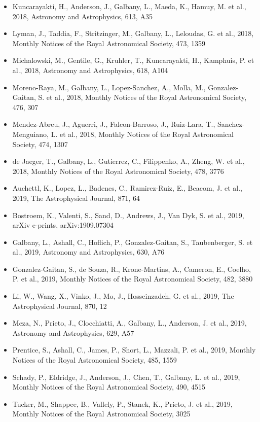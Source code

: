 \documentclass{letter}
\begin{document}
\begin{enumerate}
\begin{itemize}
\item Kuncarayakti, H., Anderson, J., Galbany, L., Maeda, K., Hamuy, M. et al., 2018, Astronomy and Astrophysics, 613, A35
\item Lyman, J., Taddia, F., Stritzinger, M., Galbany, L., Leloudas, G. et al., 2018, Monthly Notices of the Royal Astronomical Society, 473, 1359
\item Michalowski, M., Gentile, G., Kruhler, T., Kuncarayakti, H., Kamphuis, P. et al., 2018, Astronomy and Astrophysics, 618, A104
\item Moreno-Raya, M., Galbany, L., Lopez-Sanchez, A., Molla, M., Gonzalez-Gaitan, S. et al., 2018, Monthly Notices of the Royal Astronomical Society, 476, 307
\item Mendez-Abreu, J., Aguerri, J., Falcon-Barroso, J., Ruiz-Lara, T., Sanchez-Menguiano, L. et al., 2018, Monthly Notices of the Royal Astronomical Society, 474, 1307
\item de Jaeger, T., Galbany, L., Gutierrez, C., Filippenko, A., Zheng, W. et al., 2018, Monthly Notices of the Royal Astronomical Society, 478, 3776
\item Auchettl, K., Lopez, L., Badenes, C., Ramirez-Ruiz, E., Beacom, J. et al., 2019, The Astrophysical Journal, 871, 64
\item Bostroem, K., Valenti, S., Sand, D., Andrews, J., Van Dyk, S. et al., 2019, arXiv e-prints, arXiv:1909.07304
\item Galbany, L., Ashall, C., Hoflich, P., Gonzalez-Gaitan, S., Taubenberger, S. et al., 2019, Astronomy and Astrophysics, 630, A76
\item Gonzalez-Gaitan, S., de Souza, R., Krone-Martins, A., Cameron, E., Coelho, P. et al., 2019, Monthly Notices of the Royal Astronomical Society, 482, 3880
\item Li, W., Wang, X., Vinko, J., Mo, J., Hosseinzadeh, G. et al., 2019, The Astrophysical Journal, 870, 12
\item Meza, N., Prieto, J., Clocchiatti, A., Galbany, L., Anderson, J. et al., 2019, Astronomy and Astrophysics, 629, A57
\item Prentice, S., Ashall, C., James, P., Short, L., Mazzali, P. et al., 2019, Monthly Notices of the Royal Astronomical Society, 485, 1559
\item Schady, P., Eldridge, J., Anderson, J., Chen, T., Galbany, L. et al., 2019, Monthly Notices of the Royal Astronomical Society, 490, 4515
\item Tucker, M., Shappee, B., Vallely, P., Stanek, K., Prieto, J. et al., 2019, Monthly Notices of the Royal Astronomical Society, 3025

\end{itemize}
\end{enumerate}
\end{document}

